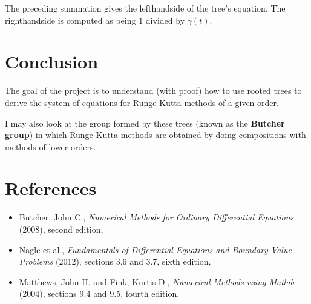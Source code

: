 \documentclass[12pt]{amsart}
\begin{document}
  The preceding summation gives the lefthandside of the tree's equation. The righthandside is
  computed as being $1$ divided by $\gamma(t)$.
  
  \section[*]{\textbf{Conclusion}}
  The goal of the project is to understand (with proof) how to use rooted trees to
  derive the system of equations for Runge-Kutta methods of a given order.

  I may also look at the group formed by these trees (known as the \textbf{Butcher group})
  in which Runge-Kutta methods are obtained by doing compositions with methods of lower 
  orders.

  \section[*]{\textbf{References}}
  \begin{itemize} \item Butcher, John C., \textit{Numerical Methods for Ordinary Differential   
  Equations} (2008), second edition,
  \item Nagle et al., \textit{Fundamentals of Differential Equations and Boundary Value Problems}
           (2012), sections 3.6 and 3.7, sixth edition,
  \item Matthews, John H. and Fink, Kurtis D., \textit{Numerical Methods using Matlab} (2004),
           sections 9.4 and 9.5, fourth edition. 
  \end{itemize}
  
\end{document}
